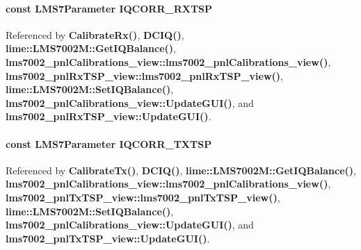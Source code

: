 \paragraph[{I\+Q\+C\+O\+R\+R\+\_\+\+R\+X\+T\+SP}]{\setlength{\rightskip}{0pt plus 5cm}const {\bf L\+M\+S7\+Parameter} I\+Q\+C\+O\+R\+R\+\_\+\+R\+X\+T\+SP}\label{LMS7002M__parameters__compact_8h_a4f466ccdb4467ad533d40e4e7226f189}


Referenced by {\bf Calibrate\+Rx()}, {\bf D\+C\+I\+Q()}, {\bf lime\+::\+L\+M\+S7002\+M\+::\+Get\+I\+Q\+Balance()}, {\bf lms7002\+\_\+pnl\+Calibrations\+\_\+view\+::lms7002\+\_\+pnl\+Calibrations\+\_\+view()}, {\bf lms7002\+\_\+pnl\+Rx\+T\+S\+P\+\_\+view\+::lms7002\+\_\+pnl\+Rx\+T\+S\+P\+\_\+view()}, {\bf lime\+::\+L\+M\+S7002\+M\+::\+Set\+I\+Q\+Balance()}, {\bf lms7002\+\_\+pnl\+Calibrations\+\_\+view\+::\+Update\+G\+U\+I()}, and {\bf lms7002\+\_\+pnl\+Rx\+T\+S\+P\+\_\+view\+::\+Update\+G\+U\+I()}.

\paragraph[{I\+Q\+C\+O\+R\+R\+\_\+\+T\+X\+T\+SP}]{\setlength{\rightskip}{0pt plus 5cm}const {\bf L\+M\+S7\+Parameter} I\+Q\+C\+O\+R\+R\+\_\+\+T\+X\+T\+SP}\label{LMS7002M__parameters__compact_8h_ae4df406d582f44d183a99dd3fc955417}


Referenced by {\bf Calibrate\+Tx()}, {\bf D\+C\+I\+Q()}, {\bf lime\+::\+L\+M\+S7002\+M\+::\+Get\+I\+Q\+Balance()}, {\bf lms7002\+\_\+pnl\+Calibrations\+\_\+view\+::lms7002\+\_\+pnl\+Calibrations\+\_\+view()}, {\bf lms7002\+\_\+pnl\+Tx\+T\+S\+P\+\_\+view\+::lms7002\+\_\+pnl\+Tx\+T\+S\+P\+\_\+view()}, {\bf lime\+::\+L\+M\+S7002\+M\+::\+Set\+I\+Q\+Balance()}, {\bf lms7002\+\_\+pnl\+Calibrations\+\_\+view\+::\+Update\+G\+U\+I()}, and {\bf lms7002\+\_\+pnl\+Tx\+T\+S\+P\+\_\+view\+::\+Update\+G\+U\+I()}.

